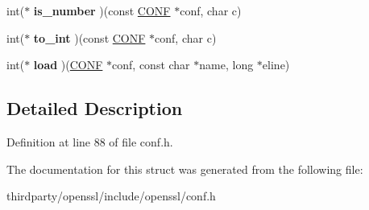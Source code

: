 \begin{DoxyCompactItemize}
\item 
\mbox{\label{structconf__method__st_a696db4ab9f125a3ccd0c12da8a182cb0}} 
int($\ast$ {\bfseries is\+\_\+number} )(const \hyperlink{structconf__st}{C\+O\+NF} $\ast$conf, char c)
\item 
\mbox{\label{structconf__method__st_afa9903c936cd9de9822cc65f4fe0b34f}} 
int($\ast$ {\bfseries to\+\_\+int} )(const \hyperlink{structconf__st}{C\+O\+NF} $\ast$conf, char c)
\item 
\mbox{\label{structconf__method__st_a27a9c46f51b45cebe7401e2e0d2beb3c}} 
int($\ast$ {\bfseries load} )(\hyperlink{structconf__st}{C\+O\+NF} $\ast$conf, const char $\ast$name, long $\ast$eline)
\end{DoxyCompactItemize}


\subsection{Detailed Description}


Definition at line 88 of file conf.\+h.



The documentation for this struct was generated from the following file\+:\begin{DoxyCompactItemize}
\item 
thirdparty/openssl/include/openssl/conf.\+h\end{DoxyCompactItemize}
